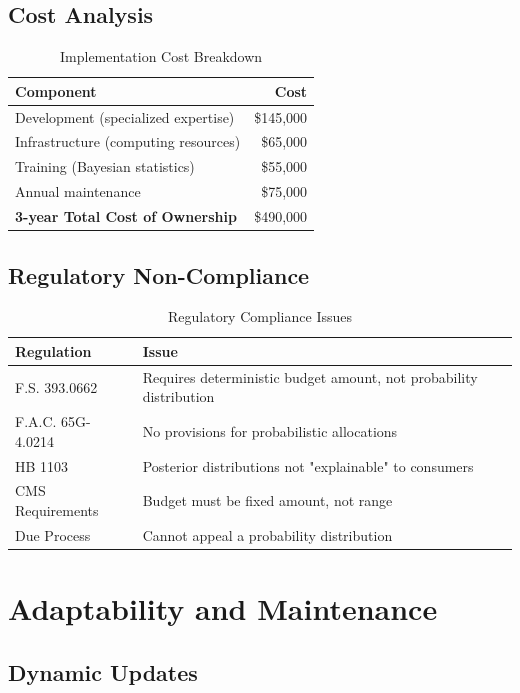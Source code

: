 \subsection{Cost Analysis}

\begin{table}[h]
\centering
\caption{Implementation Cost Breakdown}
\begin{tabular}{lr}
\toprule
\textbf{Component} & \textbf{Cost} \\
\midrule
Development (specialized expertise) & \$145,000 \\
Infrastructure (computing resources) & \$65,000 \\
Training (Bayesian statistics) & \$55,000 \\
Annual maintenance & \$75,000 \\
\textbf{3-year Total Cost of Ownership} & \$490,000 \\
\bottomrule
\end{tabular}
\end{table}

\subsection{Regulatory Non-Compliance}

\begin{table}[h]
\centering
\caption{Regulatory Compliance Issues}
\begin{tabular}{p{3cm}p{9cm}}
\toprule
\textbf{Regulation} & \textbf{Issue} \\
\midrule
F.S. 393.0662 & Requires deterministic budget amount, not probability distribution \\
F.A.C. 65G-4.0214 & No provisions for probabilistic allocations \\
HB 1103 & Posterior distributions not "explainable" to consumers \\
CMS Requirements & Budget must be fixed amount, not range \\
Due Process & Cannot appeal a probability distribution \\
\bottomrule
\end{tabular}
\end{table}

\section{Adaptability and Maintenance}

\subsection{Dynamic Updates}

